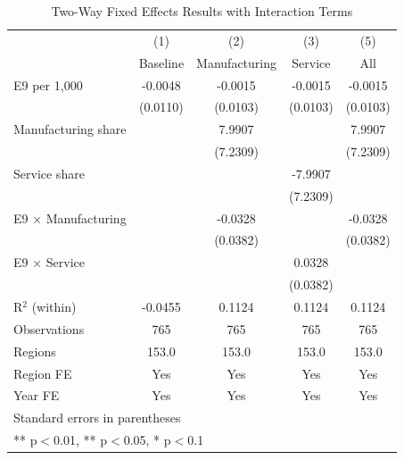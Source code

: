 \begin{table}[htbp]
\centering
\caption{Two-Way Fixed Effects Results with Interaction Terms}
\label{tab:twfe_interactions}
\begin{tabular}{lcccc}
\hline\hline
 & (1) & (2) & (3) & (5) \\
 & Baseline & Manufacturing & Service & All \\
\hline
E9 per 1,000 & -0.0048 & -0.0015 & -0.0015 & -0.0015 \\
 & (0.0110) & (0.0103) & (0.0103) & (0.0103) \\
Manufacturing share &  & 7.9907 &  & 7.9907 \\
 &  & (7.2309) &  & (7.2309) \\
Service share &  &  & -7.9907 &  \\
 &  &  & (7.2309) &  \\
E9 × Manufacturing &  & -0.0328 &  & -0.0328 \\
 &  & (0.0382) &  & (0.0382) \\
E9 × Service &  &  & 0.0328 &  \\
 &  &  & (0.0382) &  \\
\hline
R$^2$ (within) & -0.0455 & 0.1124 & 0.1124 & 0.1124 \\
Observations & 765 & 765 & 765 & 765 \\
Regions & 153.0 & 153.0 & 153.0 & 153.0 \\
Region FE & Yes & Yes & Yes & Yes \\
Year FE & Yes & Yes & Yes & Yes \\
\hline\hline
\multicolumn{5}{l}{\footnotesize Standard errors in parentheses} \\
\multicolumn{5}{l}{\footnotesize *** p$<$0.01, ** p$<$0.05, * p$<$0.1} \\
\end{tabular}
\end{table}
